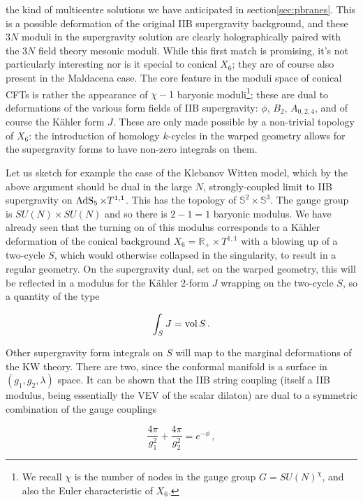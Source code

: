 the kind of multicentre solutions we have anticipated in section\ref{sec:pbranes}. This is a possible deformation of the original IIB supergravity background, and these $3N$ moduli in the supergravity solution are clearly holographically paired with the $3N$ field theory mesonic moduli. While this first match is promising, it's not particularly interesting nor is it special to conical $X_6$; they are of course also present in the Maldacena case. The core feature in the moduli space of conical CFTs is rather the appearance of $\chi-1$ baryonic moduli\footnote{We recall $\chi$ is the number of nodes in the gauge group $G = SU(N)^\chi$, and also the Euler characteristic of $X_6$.}; these are dual to deformations of the various form fields of IIB supergravity: $\phi$, $B_2$, $A_{0,2,4}$, and of course the K\"ahler form $J$. These are only made possible by a non-trivial topology of $X_6$: the introduction of homology $k$-cycles in the warped geometry allows for the supergravity forms to have non-zero integrals on them.

Let us sketch for example the case of the Klebanov Witten model, which by the above argument should be dual in the large $N$, strongly-coupled limit to IIB supergravity on $\operatorname{AdS}_{5} \times T^{1,1}$. This has the topology of $\mathbb{S}^2 \times \mathbb{S}^3$\cite{Candelas}. The gauge group is $SU(N)\times SU(N)$ and so there is $2-1 = 1$ baryonic modulus. We have already seen that the turning on of this modulus corresponds to a K\"ahler deformation of the conical background $X_6 = \mathbb{R}_+ \times T^{1,1}$ with a blowing up of a two-cycle $S$, which would otherwise collapsed in the singularity, to result in a regular geometry. On the supergravity dual, set on the warped geometry, this will be reflected in a modulus for the K\"ahler 2-form $J$ wrapping on the two-cycle $S$, so a quantity of the type

\begin{equation}
	\int_S J = \operatorname{vol} S\,.
	\label{}
\end{equation}

Other supergravity form integrals on $S$ will map to the marginal deformations of the KW theory. There are two, since the conformal manifold is a surface in $(g_1,g_2,\lambda)$ space. It can be shown\cite{erdmenger} that the IIB string coupling (itself a IIB modulus, being essentially the VEV of the scalar dilaton) are dual to a symmetric combination of the gauge couplings

\begin{equation}
	\frac{4\pi}{g_1^2} + \frac{4\pi}{g_2^2} = e^{-\phi}\,,
	\label{}
\end{equation}

